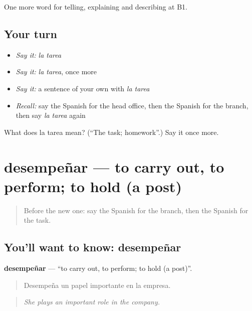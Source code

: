 \begin{grammarlens}[title={What you've built}]
One more word for telling, explaining and describing at B1.
\end{grammarlens}

\subsection*{Your turn}
\begin{itemize}
\raggedright
  \item \emph{Say it:} \emph{la tarea}
  \item \emph{Say it:} \emph{la tarea}, once more
  \item \emph{Say it:} a sentence of your own with \emph{la tarea}
  \item \emph{Recall:} say the Spanish for the head office, then the Spanish for the branch, then say \emph{la tarea} again
\end{itemize}

\begin{tcolorbox}[breakable,colback=teal!4,colframe=teal!35!black,title={Before you move on}]
What does la tarea mean? (\textquotedblleft{}The task; homework\textquotedblright{}.) Say it once more.
\end{tcolorbox}
\section[desempeñar]{desempeñar — to carry out, to perform; to hold (a post)}

\label{lesson:ES-C593-desempenar}



\begin{quote}
Before the new one: say the Spanish for the branch, then the Spanish for the task.
\end{quote}

\subsection*{You'll want to know: desempeñar}
\textbf{desempeñar} — \textquotedblleft{}to carry out, to perform; to hold (a post)\textquotedblright{}.

\begin{quote}
Desempeña un papel importante en la empresa.
\end{quote}

\begin{quote}
\emph{She plays an important role in the company.}
\end{quote}

